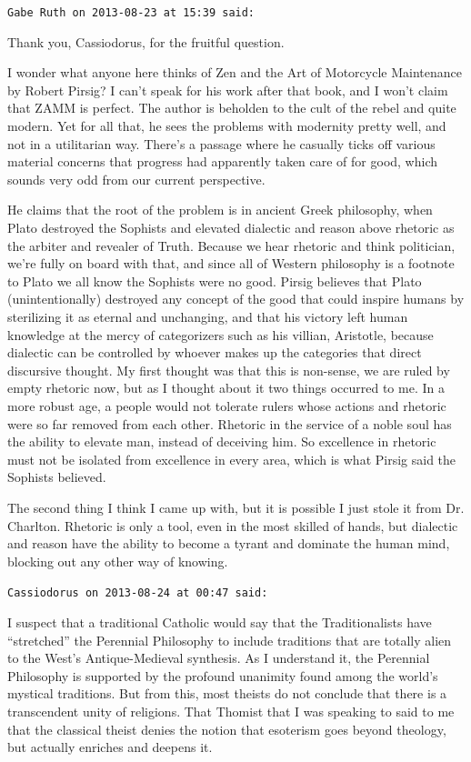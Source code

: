 \begin{footnotesize}
\begin{sffamily}
\hfill

\texttt{Gabe Ruth on 2013-08-23 at 15:39 said:}

Thank you, Cassiodorus, for the fruitful question.

I wonder what anyone here thinks of Zen and the Art of Motorcycle Maintenance by Robert Pirsig? I can't speak for his work after that book, and I won't claim that ZAMM is perfect. The author is beholden to the cult of the rebel and quite modern. Yet for all that, he sees the problems with modernity pretty well, and not in a utilitarian way. There's a passage where he casually ticks off various material concerns that progress had apparently taken care of for good, which sounds very odd from our current perspective.

He claims that the root of the problem is in ancient Greek philosophy, when Plato destroyed the Sophists and elevated dialectic and reason above rhetoric as the arbiter and revealer of Truth. Because we hear rhetoric and think politician, we're fully on board with that, and since all of Western philosophy is a footnote to Plato we all know the Sophists were no good. Pirsig believes that Plato (unintentionally) destroyed any concept of the good that could inspire humans by sterilizing it as eternal and unchanging, and that his victory left human knowledge at the mercy of categorizers such as his villian, Aristotle, because dialectic can be controlled by whoever makes up the categories that direct discursive thought. My first thought was that this is non-sense, we are ruled by empty rhetoric now, but as I thought about it two things occurred to me. In a more robust age, a people would not tolerate rulers whose actions and rhetoric were so far removed from each other. Rhetoric in the service of a noble soul has the ability to elevate man, instead of deceiving him. So excellence in rhetoric must not be isolated from excellence in every area, which is what Pirsig said the Sophists believed.

The second thing I think I came up with, but it is possible I just stole it from Dr. Charlton. Rhetoric is only a tool, even in the most skilled of hands, but dialectic and reason have the ability to become a tyrant and dominate the human mind, blocking out any other way of knowing.

\hfill

\texttt{Cassiodorus on 2013-08-24 at 00:47 said:}

I suspect that a traditional Catholic would say that the Traditionalists have ``stretched'' the Perennial Philosophy to include traditions that are totally alien to the West's Antique-Medieval synthesis. As I understand it, the Perennial Philosophy is supported by the profound unanimity found among the world's mystical traditions. But from this, most theists do not conclude that there is a transcendent unity of religions. That Thomist that I was speaking to said to me that the classical theist denies the notion that esoterism goes beyond theology, but actually enriches and deepens it.


\end{sffamily}
\end{footnotesize}
